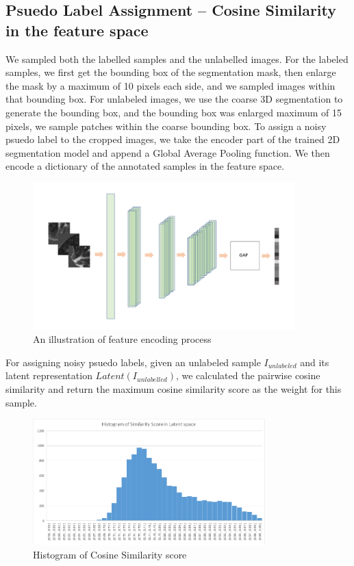 \subsection{Psuedo Label Assignment -- Cosine Similarity in the feature space}
We sampled both the labelled samples and the unlabelled images. For the labeled samples, we first get the bounding box of the segmentation mask, then enlarge the mask by a maximum of 10 pixels each side, and we sampled images within that bounding box.
For unlabeled images, we use the coarse 3D segmentation to generate the bounding box, and the bounding box was enlarged maximum of 15 pixels, we sample patches within the coarse bounding box.
To assign a noisy psuedo label to the cropped images, we take the encoder part of the trained 2D segmentation model and append a Global Average Pooling function. We then encode a dictionary of the annotated samples in the feature space.\\
\begin{figure}
	\centering
	\includegraphics[width=0.9\textwidth]{img/semi-experiment/latent-space}
	\caption{An illustration of feature encoding process}
\end{figure}

For assigning noisy psuedo labels, given an unlabeled sample $I_{unlabeled}$ and its latent representation $Latent(I_{unlabelled})$, we calculated the pairwise cosine similarity and return the maximum cosine similarity score as the weight for this sample. \\
\begin{figure}[h]
	\centering
	\includegraphics[width=0.8\textwidth]{img/semi-experiment/cosine_sim_histogram}
	\caption{Histogram of Cosine Similarity score}
	\label{fig:score_hist}
\end{figure}


